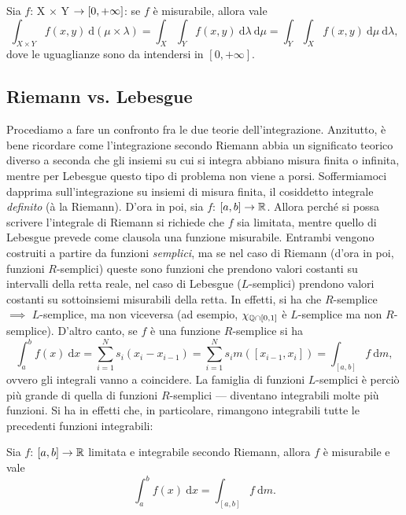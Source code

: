 \documentclass[Completo.tex]{subfiles}
\begin{document}
	\begin{Th}
		Sia $f$: X $\times$ Y $\rightarrow [0, +\infty]$: se $f$ è misurabile, allora vale
		\begin{equation*}
		\int_{X \times Y} f(x,y) \ \mathrm{d}(\mu \times \lambda) = \int_X \int_Y f(x,y) \ \mathrm{d}\lambda \ \mathrm{d}\mu = \int_Y \int_X f(x,y) \ \mathrm{d}\mu \ \mathrm{d}\lambda,
		\end{equation*}
		dove le uguaglianze sono da intendersi in $[0, +\infty]$.
	\end{Th}
	\subsection{Riemann vs. Lebesgue}
	Procediamo a fare un confronto fra le due teorie dell'integrazione. Anzitutto, è bene ricordare come l'integrazione secondo Riemann abbia un significato teorico diverso a seconda che gli insiemi su cui si integra abbiano misura finita o infinita, mentre per Lebesgue questo tipo di problema non viene a porsi. Soffermiamoci dapprima sull'integrazione su insiemi di misura finita, il cosiddetto integrale \textit{definito} (à la Riemann). D'ora in poi, sia $f$: $[a,b] \ra \bb[R]$. Allora perché si possa scrivere l'integrale di Riemann si richiede che $f$ sia limitata, mentre quello di Lebesgue prevede come clausola una funzione misurabile. Entrambi vengono costruiti a partire da funzioni \textit{semplici}, ma se nel caso di Riemann (d'ora in poi, funzioni $R$-semplici) queste sono funzioni che prendono valori costanti su intervalli della retta reale, nel caso di Lebesgue ($L$-semplici) prendono valori costanti su sottoinsiemi misurabili della retta. In effetti, si ha che $R$-semplice $\implies$ $L$-semplice, ma non viceversa (ad esempio, $\chi_{\bb[Q] \cap [0,1]}$ è $L$-semplice ma non $R$-semplice). D'altro canto, se $f$ è una funzione $R$-semplice si ha
	\begin{equation*}
	\int_{a}^{b} f(x) \ \mathrm{d}x = \sum_{i=1}^{N} s_i (x_i - x_{i-1}) = \sum_{i=1}^{N} s_i m([x_{i-1}, x_i]) = \int_{[a,b]} f \ \mathrm{d}m, 
	\end{equation*}
	ovvero gli integrali vanno a coincidere. La famiglia di funzioni $L$-semplici è perciò più grande di quella di funzioni $R$-semplici --- diventano integrabili molte più funzioni. Si ha in effetti che, in particolare, rimangono integrabili tutte le precedenti funzioni integrabili:
	\begin{eTh}
		Sia $f$: $[a,b] \ra \bb[R]$ limitata e integrabile secondo Riemann, allora $f$ è misurabile e vale
		\begin{equation*}
		\int_{a}^{b} f(x) \ \mathrm{d}x = \int_{[a,b]} f \ \mathrm{d}m.
		\end{equation*}
	\end{eTh}
\end{document}

